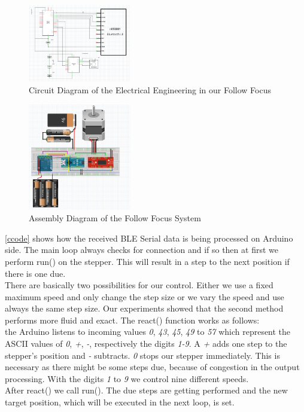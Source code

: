 \documentclass{sigchi}
\begin{document}
\begin{figure}
\includegraphics[width=0.4\textwidth]{circuit.png}
\caption{Circuit Diagram of the Electrical Engineering in our Follow Focus}
\label{fig:Circuit}
\end{figure}
\begin{figure}
\includegraphics[width=0.4\textwidth]{assembly.png}
\caption{Assembly Diagram of the Follow Focus System}
\label{fig:Assembly}
\end{figure}
	
\autoref{ccode} shows how the received BLE Serial data is being processed on Arduino side. The main loop always checks for connection and if so then at first we perform run() on the stepper. This will result in a step to the next position if there is one due. \\
There are basically two possibilities for our control. Either we use a fixed maximum speed and only change the step size or we vary the speed and use always the same step size. Our experiments showed that the second method performs more fluid and exact. The react() function works as follows: \\
the Arduino listens to incoming values \textit{0}, \textit{43}, \textit{45}, \textit{49} to \textit{57} which represent the ASCII values of \textit{0}, \textit{+}, \textit{-}, respectively the digits \textit{1-9}. A \textit{+} adds one step to the stepper's position and \textit{-} subtracts. \textit{0} stops our stepper immediately. This is necessary as there might be some steps due, because of congestion in the output processing. With the digits \textit{1} to \textit{9} we control nine different speeds.\\
After react() we call run(). The due steps are getting performed and the new target position, which will be executed in the next loop, is set.

 
\end{document}
